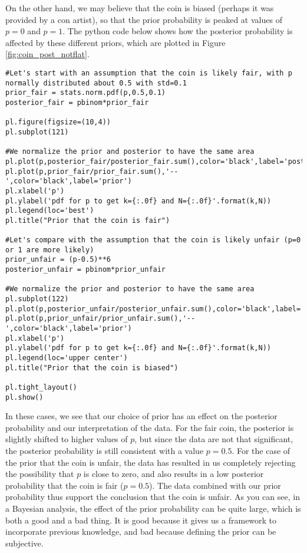 On the other hand, we may believe that the coin is biased (perhaps it was provided by a con artist), so that the prior probability is peaked at values of $p=0$ and $p=1$. The python code below shows how the posterior probability is affected by these different priors, which are plotted in Figure \ref{fig:coin_post_notflat}.
\begin{lstlisting}[frame=single] 
#Let's start with an assumption that the coin is likely fair, with p normally distributed about 0.5 with std=0.1
prior_fair = stats.norm.pdf(p,0.5,0.1)
posterior_fair = pbinom*prior_fair

pl.figure(figsize=(10,4))
pl.subplot(121)

#We normalize the prior and posterior to have the same area
pl.plot(p,posterior_fair/posterior_fair.sum(),color='black',label='posterior')
pl.plot(p,prior_fair/prior_fair.sum(),'--',color='black',label='prior')
pl.xlabel('p')
pl.ylabel('pdf for p to get k={:.0f} and N={:.0f}'.format(k,N))
pl.legend(loc='best')
pl.title("Prior that the coin is fair")

#Let's compare with the assumption that the coin is likely unfair (p=0 or 1 are more likely)
prior_unfair = (p-0.5)**6
posterior_unfair = pbinom*prior_unfair

#We normalize the prior and posterior to have the same area
pl.subplot(122)
pl.plot(p,posterior_unfair/posterior_unfair.sum(),color='black',label='posterior')
pl.plot(p,prior_unfair/prior_unfair.sum(),'--',color='black',label='prior')
pl.xlabel('p')
pl.ylabel('pdf for p to get k={:.0f} and N={:.0f}'.format(k,N))
pl.legend(loc='upper center')
pl.title("Prior that the coin is biased")

pl.tight_layout()
pl.show()
\end{lstlisting}

In these cases, we see that our choice of prior has an effect on the posterior probability and our interpretation of the data. For the fair coin, the posterior is slightly shifted to higher values of $p$, but since the data are not that significant, the posterior probability is still consistent with a value $p=0.5$. For the case of the prior that the coin is unfair, the data has resulted in us completely rejecting the possibility that $p$ is close to zero, and also results in a low posterior probability that the coin is fair ($p=0.5$). The data combined with our prior probability thus support the conclusion that the coin is unfair. As you can see, in a Bayesian analysis, the effect of the prior probability can be quite large, which is both a good and a bad thing. It is good because it gives us a framework to incorporate previous knowledge, and bad because defining the prior can be subjective.

